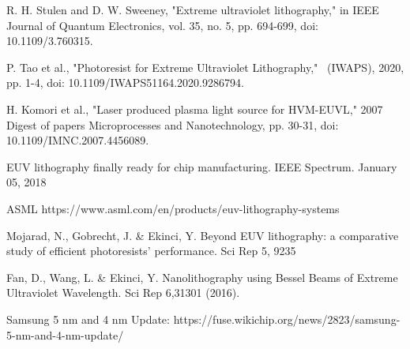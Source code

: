 \documentclass[12pt,a4paper]{report}
\begin{document}
\begin{thebibliography}{99}

R. H. Stulen and D. W. Sweeney, "Extreme ultraviolet lithography," in IEEE Journal of Quantum Electronics, 
      vol. 35, no. 5, pp. 694-699, doi: 10.1109/3.760315.

P. Tao et al., "Photoresist for Extreme Ultraviolet Lithography,"  (IWAPS), 2020, pp. 1-4, 
     doi: 10.1109/IWAPS51164.2020.9286794.

H. Komori et al., "Laser produced plasma light source for HVM-EUVL," 2007 Digest of papers 
     Microprocesses and Nanotechnology, pp. 30-31, doi: 10.1109/IMNC.2007.4456089.

EUV lithography finally ready for chip manufacturing. IEEE Spectrum. January 05, 2018

ASML https://www.asml.com/en/products/euv-lithography-systems      

Mojarad, N., Gobrecht, J. \& Ekinci, Y. Beyond EUV lithography: a comparative study of efficient photoresists' performance. Sci Rep 5, 9235

Fan, D., Wang, L. \& Ekinci, Y. Nanolithography using Bessel Beams of Extreme Ultraviolet Wavelength. Sci Rep 6,31301 (2016).

Samsung 5 nm and 4 nm Update: https://fuse.wikichip.org/news/2823/samsung-5-nm-and-4-nm-update/


\end{thebibliography}
\end{document}
